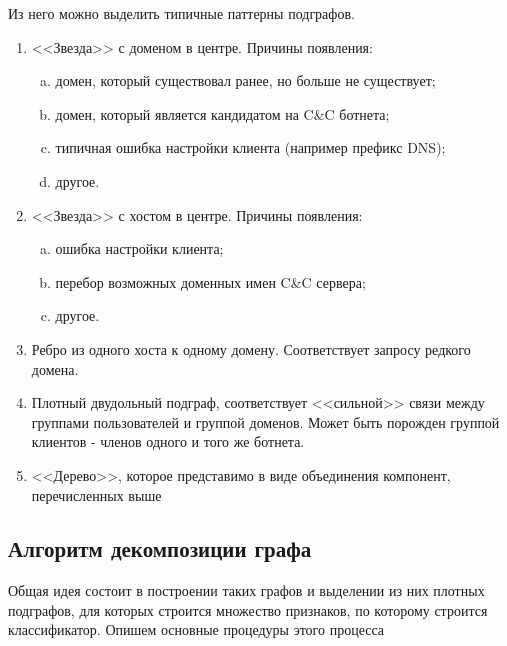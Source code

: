 \documentclass[a4paper,14pt]{extreport} %
\begin{document}
	
Из него можно выделить типичные паттерны подграфов.
\begin{enumerate}
	\item <<Звезда>> с доменом в центре. Причины появления:
	      \begin{enumerate}[a)]
	      	\item домен, который существовал ранее, но больше не существует;
	      	\item домен, который является кандидатом на C\&C ботнета;
	      	\item типичная ошибка настройки клиента (например префикс DNS);
	      	\item другое.
	      \end{enumerate}
	\item <<Звезда>> с хостом в центре. Причины появления:
	      \begin{enumerate}[a)]
	      	\item ошибка настройки клиента;
	      	\item перебор возможных доменных имен C\&C сервера;
	      	\item другое.
	      \end{enumerate}
	      	      	
	\item Ребро из одного хоста к одному домену. Соответствует запросу редкого домена.
	      	      	
	\item Плотный двудольный подграф, соответствует <<сильной>> связи между группами пользователей и группой доменов. Может быть порожден группой клиентов - членов одного и того же ботнета.
	      	      	
	\item <<Дерево>>, которое представимо в виде объединения компонент, перечисленных выше
\end{enumerate}
	
\subsection{Алгоритм декомпозиции графа}
Общая идея состоит в построении таких графов и выделении из них плотных подграфов, для которых строится множество признаков, по которому строится классификатор. Опишем основные процедуры этого процесса
	
\end{document}
